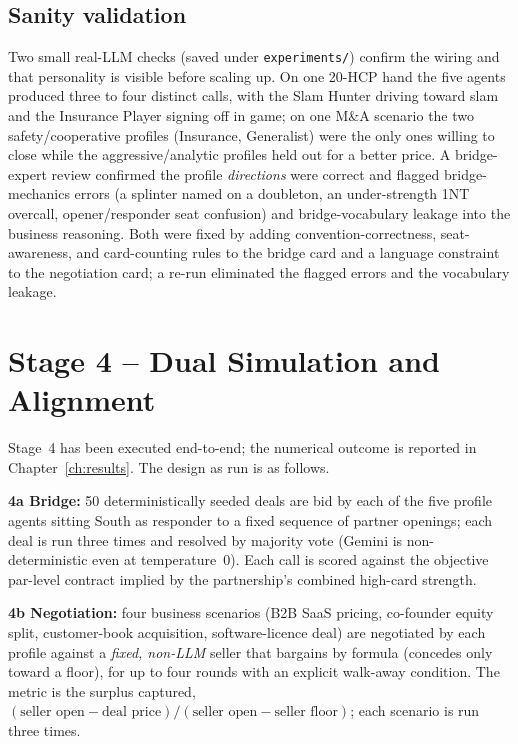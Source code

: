\documentclass[11pt, a4paper, oneside, openany]{report}
\begin{document}
\subsection*{Sanity validation}
Two small real-LLM checks (saved under \texttt{experiments/}) confirm the wiring and that personality is visible before scaling up. On one 20-HCP hand the five agents produced three to four distinct calls, with the Slam Hunter driving toward slam and the Insurance Player signing off in game; on one M\&A scenario the two safety/cooperative profiles (Insurance, Generalist) were the only ones willing to close while the aggressive/analytic profiles held out for a better price. A bridge-expert review confirmed the profile \emph{directions} were correct and flagged bridge-mechanics errors (a splinter named on a doubleton, an under-strength 1NT overcall, opener/responder seat confusion) and bridge-vocabulary leakage into the business reasoning. Both were fixed by adding convention-correctness, seat-awareness, and card-counting rules to the bridge card and a language constraint to the negotiation card; a re-run eliminated the flagged errors and the vocabulary leakage.

\section{Stage 4 -- Dual Simulation and Alignment}

Stage~4 has been executed end-to-end; the numerical outcome is reported in Chapter~\ref{ch:results}. The design as run is as follows.

\textbf{4a Bridge:} 50 deterministically seeded deals are bid by each of the five profile agents sitting South as responder to a fixed sequence of partner openings; each deal is run three times and resolved by majority vote (Gemini is non-deterministic even at temperature~0). Each call is scored against the objective par-level contract implied by the partnership's combined high-card strength.

\textbf{4b Negotiation:} four business scenarios (B2B SaaS pricing, co-founder equity split, customer-book acquisition, software-licence deal) are negotiated by each profile against a \emph{fixed, non-LLM} seller that bargains by formula (concedes only toward a floor), for up to four rounds with an explicit walk-away condition. The metric is the surplus captured, $(\text{seller open} - \text{deal price}) / (\text{seller open} - \text{seller floor})$; each scenario is run three times.
\end{document}
